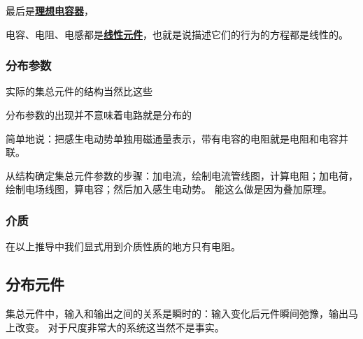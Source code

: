 \documentclass[UTF8, a4paper]{ctexart}
\newcommand*{\concept}[1]{\underline{\textbf{#1}}}
\begin{document}
最后是\concept{理想电容器}，

电容、电阻、电感都是\concept{线性元件}，也就是说描述它们的行为的方程都是线性的。

\subsubsection{分布参数}

实际的集总元件的结构当然比这些

分布参数的出现并不意味着电路就是分布的

简单地说：把感生电动势单独用磁通量表示，带有电容的电阻就是电阻和电容并联。

从结构确定集总元件参数的步骤：加电流，绘制电流管线图，计算电阻；加电荷，绘制电场线图，算电容；然后加入感生电动势。
能这么做是因为叠加原理。

\subsubsection{介质}

在以上推导中我们显式用到介质性质的地方只有电阻。

\subsection{分布元件}

集总元件中，输入和输出之间的关系是瞬时的：输入变化后元件瞬间弛豫，输出马上改变。
对于尺度非常大的系统这当然不是事实。
\end{document}
